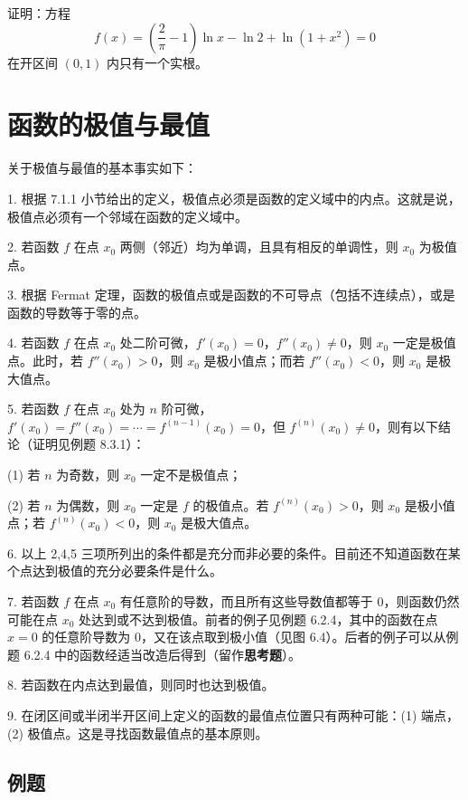 \begin{xexercise}[8]
证明：方程
  \[
    f(x)=\left(\frac2\pi-1\right)\ln x-\ln2+\ln(1+x^2)=0
  \]
  在开区间 $(0,1)$ 内只有一个实根。
\end{xexercise}

\section{函数的极值与最值}

关于极值与最值的基本事实如下：

1. 根据 7.1.1 小节给出的定义，极值点必须是函数的定义域中的内点。这就是说，极值点必须有一个邻域在函数的定义域中。

2. 若函数 $f$ 在点 $x_0$ 两侧（邻近）均为单调，且具有相反的单调性，则 $x_0$ 为极值点。

3. 根据 Fermat 定理，函数的极值点或是函数的不可导点（包括不连续点），或是函数的导数等于零的点。

4. 若函数 $f$ 在点 $x_0$ 处二阶可微，$f'(x_0)=0$，$f''(x_0)\ne0$，则 $x_0$ 一定是极值点。此时，若 $f''(x_0)>0$，则 $x_0$ 是极小值点；而若 $f''(x_0)<0$，则 $x_0$ 是极大值点。

5. 若函数 $f$ 在点 $x_0$ 处为 $n$ 阶可微，$f'(x_0)=f''(x_0)=\cdots=f^{(n-1)}(x_0)=0$，但 $f^{(n)}(x_0)\ne0$，则有以下结论（证明见例题 8.3.1）：

(1) 若 $n$ 为奇数，则 $x_0$ 一定不是极值点；

(2) 若 $n$ 为偶数，则 $x_0$ 一定是 $f$ 的极值点。若 $f^{(n)}(x_0)>0$，则 $x_0$ 是极小值点；若 $f^{(n)}(x_0)<0$，则 $x_0$ 是极大值点。

6. 以上 2,4,5 三项所列出的条件都是充分而非必要的条件。目前还不知道函数在某个点达到极值的充分必要条件是什么。

7. 若函数 $f$ 在点 $x_0$ 有任意阶的导数，而且所有这些导数值都等于 0，则函数仍然可能在点 $x_0$ 处达到或不达到极值。前者的例子见例题 6.2.4，其中的函数在点 $x=0$ 的任意阶导数为 0，又在该点取到极小值（见图 6.4）。后者的例子可以从例题 6.2.4 中的函数经适当改造后得到（留作\textbf{思考题}）。

8. 若函数在内点达到最值，则同时也达到极值。

9. 在闭区间或半闭半开区间上定义的函数的最值点位置只有两种可能：(1) 端点，(2) 极值点。这是寻找函数最值点的基本原则。

\subsection{例题}

